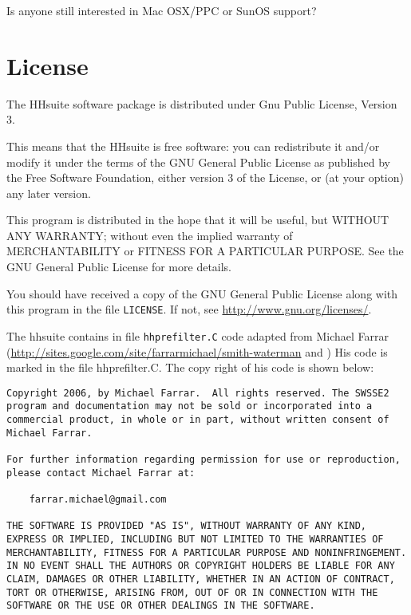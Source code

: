 \documentclass[11pt,a4paper]{article}
\begin{document}
Is anyone still interested in Mac OSX/PPC or SunOS support? 


\section{License}

The HHsuite software package is distributed under Gnu Public License, Version 3. 

This means that the HHsuite is free software: you can redistribute it and/or modify
it under the terms of the GNU General Public License as published by
the Free Software Foundation, either version 3 of the License, or
(at your option) any later version.

This program is distributed in the hope that it will be useful,
but WITHOUT ANY WARRANTY; without even the implied warranty of
MERCHANTABILITY or FITNESS FOR A PARTICULAR PURPOSE.  See the
GNU General Public License for more details.

You should have received a copy of the GNU General Public License
along with this program in the file \verb`LICENSE`.  
If not, see \url{http://www.gnu.org/licenses/}.

The hhsuite contains in file \verb`hhprefilter.C` code adapted from Michael 
Farrar (\url{http://sites.google.com/site/farrarmichael/smith-waterman}
and \cite{Farrar:2007}) His code is marked in the file hhprefilter.C. 
The copy right of his code is shown below:

\begin{verbatim}
Copyright 2006, by Michael Farrar.  All rights reserved. The SWSSE2
program and documentation may not be sold or incorporated into a
commercial product, in whole or in part, without written consent of
Michael Farrar.

For further information regarding permission for use or reproduction, 
please contact Michael Farrar at:

    farrar.michael@gmail.com

THE SOFTWARE IS PROVIDED "AS IS", WITHOUT WARRANTY OF ANY KIND, 
EXPRESS OR IMPLIED, INCLUDING BUT NOT LIMITED TO THE WARRANTIES OF 
MERCHANTABILITY, FITNESS FOR A PARTICULAR PURPOSE AND NONINFRINGEMENT. 
IN NO EVENT SHALL THE AUTHORS OR COPYRIGHT HOLDERS BE LIABLE FOR ANY 
CLAIM, DAMAGES OR OTHER LIABILITY, WHETHER IN AN ACTION OF CONTRACT, 
TORT OR OTHERWISE, ARISING FROM, OUT OF OR IN CONNECTION WITH THE 
SOFTWARE OR THE USE OR OTHER DEALINGS IN THE SOFTWARE.
\end{verbatim}
\end{document}
